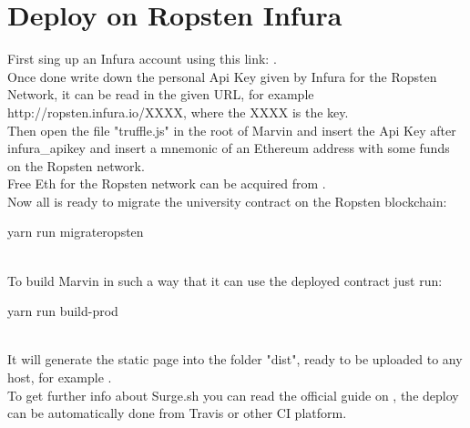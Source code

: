 \documentclass[ManualeSviluppatore]{subfiles}
\begin{document}
\section{Deploy on Ropsten Infura}
First sing up an Infura account using this link: . \\
Once done write down the personal Api Key given by Infura for the Ropsten Network, it can be read in the given URL, for example http://ropsten.infura.io/XXXX, where the XXXX is the key. \\

Then open the file "truffle.js" in the root of Marvin and insert the Api Key after infura\_apikey and insert a mnemonic of an Ethereum address with some funds on the Ropsten network.\\
Free Eth for the Ropsten network can be acquired from .\\

Now all is ready to migrate the university contract on the Ropsten blockchain: \\
\begin{ttfamily} yarn run migrateropsten \end{ttfamily} \\

To build Marvin in such a way that it can use the deployed contract just run:  \\
\begin{ttfamily} yarn run build-prod \end{ttfamily} \\
It will generate the static page into the folder "dist", ready to be uploaded to any host, for example . \\

To get further info about Surge.sh you can read the official guide on , the deploy can be automatically done from Travis or other CI platform.
\end{document}
